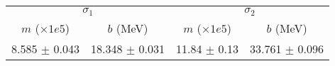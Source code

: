 \begin{tabular}{cc|cc}
\multicolumn{2}{c|}{$\sigma_1$} & \multicolumn{2}{|c}{$\sigma_2$} \\
$m$ ($\times1e5$) & $b$ (MeV) & $m$ ($\times1e5$) & $b$ (MeV) \\
\hline
8.585 $\pm$ 0.043 & 18.348 $\pm$ 0.031 & 11.84 $\pm$ 0.13 & 33.761 $\pm$ 0.096\\
\end{tabular}
